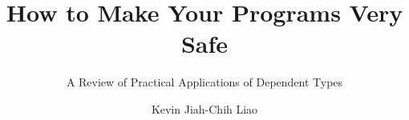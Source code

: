 \documentclass[sigplan, review]{acmart}
\begin{document}
\title{How to Make Your Programs Very Safe}
\subtitle{A Review of Practical Applications of Dependent Types}

\author{Kevin Jiah-Chih Liao}


\renewcommand{\shortauthors}{Liao}

\maketitle




 
\end{document}
